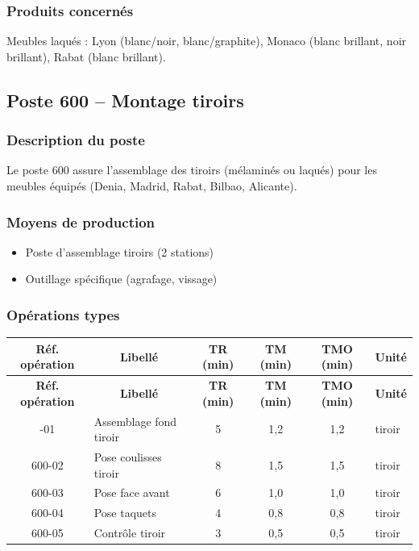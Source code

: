 \documentclass[12pt,a4paper]{article}
\begin{document}
\subsubsection{Produits concernés}
Meubles laqués : Lyon (blanc/noir, blanc/graphite), Monaco (blanc brillant, noir brillant), Rabat (blanc brillant).

\subsection{Poste 600 – Montage tiroirs}

\subsubsection{Description du poste}
Le poste 600 assure l'assemblage des tiroirs (mélaminés ou laqués) pour les meubles équipés (Denia, Madrid, Rabat, Bilbao, Alicante).

\subsubsection{Moyens de production}
\begin{itemize}
    \item Poste d'assemblage tiroirs (2 stations)
    \item Outillage spécifique (agrafage, vissage)
\end{itemize}

\subsubsection{Opérations types}

\begin{longtable}{|c|p{5cm}|c|c|c|p{3cm}|}
\hline
\multicolumn{1}{|c|}{\textbf{Réf. opération}} & \multicolumn{1}{c|}{\textbf{Libellé}} & \multicolumn{1}{c|}{\textbf{TR (min)}} & \multicolumn{1}{c|}{\textbf{TM (min)}} & \multicolumn{1}{c|}{\textbf{TMO (min)}} & \multicolumn{1}{c|}{\textbf{Unité}} \\
\hline
\endfirsthead
\hline
\multicolumn{1}{|c|}{\textbf{Réf. opération}} & \multicolumn{1}{c|}{\textbf{Libellé}} & \multicolumn{1}{c|}{\textbf{TR (min)}} & \multicolumn{1}{c|}{\textbf{TM (min)}} & \multicolumn{1}{c|}{\textbf{TMO (min)}} & \multicolumn{1}{c|}{\textbf{Unité}} \\
\hline
\endhead
\hline
\endfoot
600-01 & Assemblage fond tiroir & 5 & 1,2 & 1,2 & tiroir \\
600-02 & Pose coulisses tiroir & 8 & 1,5 & 1,5 & tiroir \\
600-03 & Pose face avant & 6 & 1,0 & 1,0 & tiroir \\
600-04 & Pose taquets & 4 & 0,8 & 0,8 & tiroir \\
600-05 & Contrôle tiroir & 3 & 0,5 & 0,5 & tiroir \\
\hline
\end{longtable}
\end{document}
